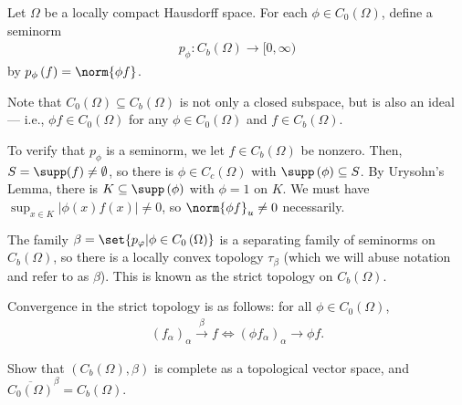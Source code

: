 \documentclass[10pt]{mypackage}
\begin{document}
\begin{example}
  Let $\Omega$ be a locally compact Hausdorff space. For each $\phi\in C_0\left(\Omega\right)$, define a seminorm
  \begin{align*}
    p_{\phi}: C_b\left(\Omega\right)\rightarrow [0,\infty)
  \end{align*}
  by $p_{\phi}\left(f\right) = \norm{\phi f}$.\newline

  Note that $C_0\left(\Omega\right)\subseteq C_b\left(\Omega\right)$ is not only a closed subspace, but is also an ideal --- i.e., $\phi f\in C_0\left(\Omega\right)$ for any $\phi\in C_0\left(\Omega\right)$ and $f\in C_b\left(\Omega\right)$.\newline

  To verify that $p_{\phi}$ is a seminorm, we let $f\in C_b\left(\Omega\right)$ be nonzero. Then, $S = \supp(f)\neq \emptyset$, so there is $\phi\in C_c\left(\Omega\right)$ with $\supp\left(\phi\right)\subseteq S$. By Urysohn's Lemma, there is $K\subseteq \supp\left(\phi\right)$ with $\phi = 1$ on $K$. We must have $\sup_{x\in K}\left\vert \phi(x)f(x) \right\vert \neq 0$, so $\norm{\phi f}_{u}\neq 0$ necessarily.\newline

  The family $\beta = \set{p_{\varphi} | \phi\in C_0\left(\Omega\right)}$ is a separating family of seminorms on $C_b\left(\Omega\right)$, so there is a locally convex topology $\tau_{\beta}$ (which we will abuse notation and refer to as $\beta$). This is known as the strict topology on $C_b\left(\Omega\right)$.\newline

  Convergence in the strict topology is as follows: for all $\phi\in C_0\left(\Omega\right)$,
  \begin{align*}
    \left(f_{\alpha}\right)_{\alpha}\xrightarrow{\beta}f \Leftrightarrow \left(\phi f_{\alpha}\right)_{\alpha}\rightarrow \phi f.
  \end{align*}
\end{example}
\begin{exercise}
  Show that $\left(C_b(\Omega),\beta\right)$ is complete as a topological vector space, and $\overline{C_0\left(\Omega\right)}^{\beta} = C_b\left(\Omega\right)$.
\end{exercise}
\end{document}
